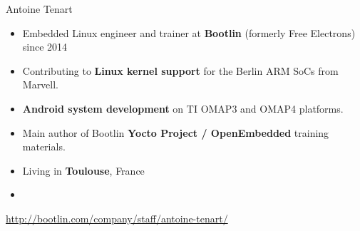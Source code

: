 \begin{frame}{Antoine Tenart}
    \begin{itemize}
	\item Embedded Linux engineer and trainer at {\bf Bootlin}
              (formerly Free Electrons) since 2014
  	\item Contributing to {\bf Linux kernel support} for the Berlin ARM
	      SoCs from Marvell.
	\item {\bf Android system development} on TI OMAP3 and OMAP4 platforms.
	\item Main author of Bootlin {\bf Yocto Project / OpenEmbedded}
	      training materials.
  	\item Living in {\bf Toulouse}, France
    	\item {}
    \end{itemize}
    {\small \url{http://bootlin.com/company/staff/antoine-tenart/}}
\end{frame}
